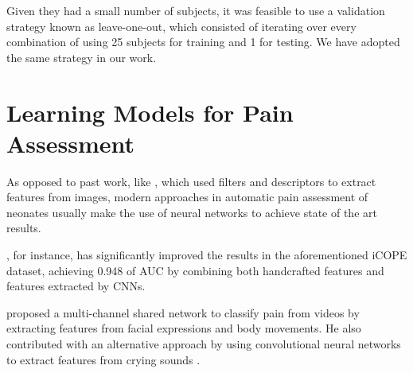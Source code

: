 Given they had a small number of subjects, it was feasible to use a validation strategy known as leave-one-out, which consisted of iterating over every combination of using 25 subjects for training and 1 for testing. We have adopted the same strategy in our work.

\section{Learning Models for Pain Assessment}

As opposed to past work, like \citep{ZhiZGALS18}, which used filters and descriptors to extract features from images, modern approaches in automatic pain assessment of neonates usually make the use of neural networks to achieve state of the art results.

\cite{abs-1807-01631}, for instance, has significantly improved the results in the aforementioned iCOPE dataset, achieving 0.948 of AUC by combining both handcrafted features and features extracted by CNNs.

\cite{SalekinZGKH019} proposed a multi-channel shared network to classify pain from videos by extracting features from facial expressions and body movements. He also contributed with an alternative approach by using convolutional neural networks to extract features from crying sounds \citep{abs-1909-02543}.




